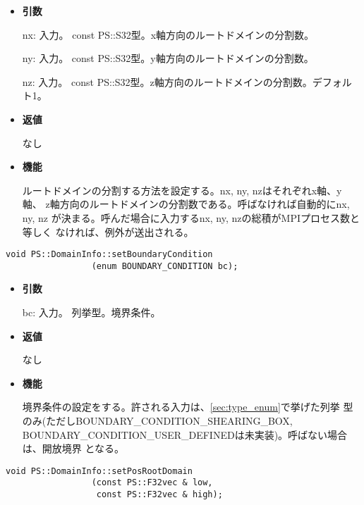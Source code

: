 \begin{itemize}

\item {\bf 引数}

nx: 入力。 const PS::S32型。x軸方向のルートドメインの分割数。

ny: 入力。 const PS::S32型。y軸方向のルートドメインの分割数。

nz: 入力。 const PS::S32型。z軸方向のルートドメインの分割数。デフォル
ト1。

\item {\bf 返値}

なし

\item {\bf 機能}

ルートドメインの分割する方法を設定する。nx, ny, nzはそれぞれx軸、y軸、
z軸方向のルートドメインの分割数である。呼ばなければ自動的にnx, ny, nz
が決まる。呼んだ場合に入力するnx, ny, nzの総積がMPIプロセス数と等しく
なければ、例外が送出される。

\end{itemize}


\begin{screen}
\begin{verbatim}
void PS::DomainInfo::setBoundaryCondition
                 (enum BOUNDARY_CONDITION bc);
\end{verbatim}
\end{screen}

\begin{itemize}

\item {\bf 引数}

bc: 入力。 列挙型。境界条件。

\item {\bf 返値}

なし

\item {\bf 機能}

境界条件の設定をする。許される入力は、\ref{sec:type_enum}で挙げた列挙
型のみ(ただしBOUNDARY\_CONDITION\_SHEARING\_BOX,
BOUNDARY\_CONDITION\_USER\_DEFINEDは未実装)。呼ばない場合は、開放境界
となる。

\end{itemize}


\begin{screen}
\begin{verbatim}
void PS::DomainInfo::setPosRootDomain
                 (const PS::F32vec & low,
                  const PS::F32vec & high);
\end{verbatim}
\end{screen}

